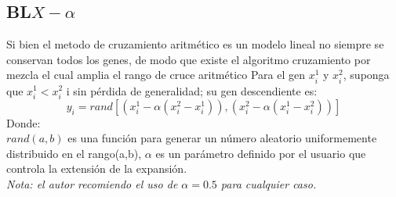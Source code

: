 \documentclass[10pt]{article}
\begin{document}
\subsection{BL$X-\alpha$}
Si bien el metodo de cruzamiento aritmético es un modelo lineal no siempre se conservan todos los genes, de modo que existe el algoritmo cruzamiento por mezcla el cual  amplia el rango de cruce aritmético  Para el gen $x^1_i$ y $x^2_i$, suponga que $x^1_i< x^2_i$ i sin pérdida de generalidad; su gen descendiente es:
\[y_{i}=rand\left[\left(x^{1}_{i}-\alpha\left(x^{2}_{i}-x^{1}_{i}\right)\right), \left(x^{2}_{i}-\alpha\left(x^{1}_{i}-x^{2}_{i}\right)\right)\right]\]
Donde:\\
$rand(a,b)$ es una función para generar un número aleatorio uniformemente distribuido en el rango(a,b), $\alpha$ es un parámetro definido por el usuario que controla la extensión de la expansión.\\
\textit{Nota: el autor recomiendo el uso de $\alpha=0.5$ para cualquier caso.}
\end{document}
